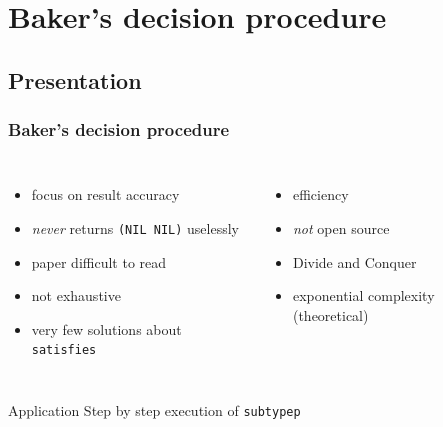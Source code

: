 \documentclass[aspectratio=169]{beamer}
\renewcommand\code[1]{\texttt{#1}}
\newcommand\rarr{\ensuremath{\rightarrow}}
\newcommand\plus{{\color{watchOS-blue}\faPlus}}
\newcommand\minus{{\color{watchOS-red}\faMinus}}
\begin{document}
\section{Baker's decision procedure}
\subsection{Presentation}

\begin{frame}
  \frametitle{Baker's decision procedure}
  \begin{columns}
    \column{.45\paperwidth}
    \begin{itemize}
    \item[\plus] focus on result accuracy
    \item[\plus] \emph{never} returns \code{(NIL NIL)} uselessly
      \pause
    \item[\minus] paper difficult to read
    \item[\minus] not exhaustive
    \item[\minus] very few solutions about \code{satisfies}
    \end{itemize}

    \pause
    \column{.45\paperwidth}
    \begin{itemize}
    \item[\plus] efficiency%
    \item[\minus] \emph{not} open source
      \pause
    \item[\plus] Divide and Conquer
    \item[\minus] exponential complexity (theoretical)
    \end{itemize}
  \end{columns}
\end{frame}

\begin{sectionframe}{Application}
  Step by step execution of \code{subtypep}
\end{sectionframe}
\end{document}

